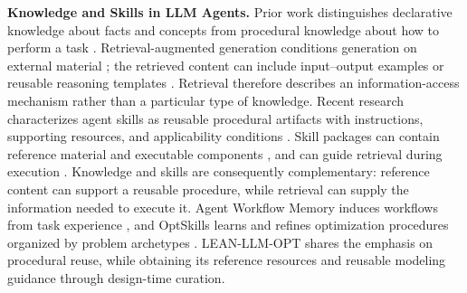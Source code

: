 
{\color{blue}
\noindent\textbf{Knowledge and Skills in LLM Agents.}
Prior work distinguishes declarative knowledge about facts and
concepts from procedural knowledge about how to perform a task
\citep{ae1_li2024metacognitive}. Retrieval-augmented generation
conditions generation on external material
\citep{ae1_lewis2020rag}; the retrieved content can include
input--output examples \citep{ae1_rubin2022epr} or reusable
reasoning templates \citep{ae1_yang2024buffer}. Retrieval therefore
describes an information-access mechanism rather than a particular
type of knowledge. Recent research characterizes agent skills as
reusable procedural artifacts with instructions, supporting
resources, and applicability conditions
\citep{ae1_zhou2026skillsurvey}. Skill packages can contain
reference material and executable components
\citep{ae1_li2026skillsbench,ae1_openai2026skills}, and can guide
retrieval during execution \citep{ae1_openai2026skilltools}.
Knowledge and skills are consequently complementary: reference
content can support a reusable procedure, while retrieval can supply
the information needed to execute it. Agent Workflow Memory induces
workflows from task experience \citep{ae1_wang2025awm}, and
OptSkills learns and refines optimization procedures organized by
problem archetypes \citep{ae1_yang2026optskills}. LEAN-LLM-OPT
shares the emphasis on procedural reuse, while obtaining its
reference resources and reusable modeling guidance through
design-time curation.
}

